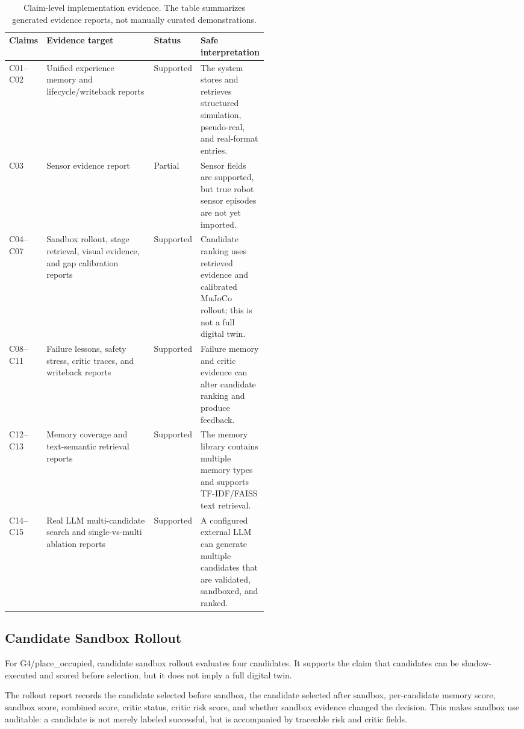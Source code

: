 \documentclass[conference]{IEEEtran}
\begin{document}
\begin{table}[t]
\centering
\caption{Claim-level implementation evidence. The table summarizes generated evidence reports, not manually curated demonstrations.}
\begin{tabularx}{\linewidth}{>{\raggedright\arraybackslash}p{0.14\linewidth}>{\raggedright\arraybackslash}X>{\raggedright\arraybackslash}p{0.18\linewidth}>{\raggedright\arraybackslash}p{0.18\linewidth}}
\toprule
Claims & Evidence target & Status & Safe interpretation \\
\midrule
C01--C02 & Unified experience memory and lifecycle/writeback reports & Supported & The system stores and retrieves structured simulation, pseudo-real, and real-format entries. \\
C03 & Sensor evidence report & Partial & Sensor fields are supported, but true robot sensor episodes are not yet imported. \\
C04--C07 & Sandbox rollout, stage retrieval, visual evidence, and gap calibration reports & Supported & Candidate ranking uses retrieved evidence and calibrated MuJoCo rollout; this is not a full digital twin. \\
C08--C11 & Failure lessons, safety stress, critic traces, and writeback reports & Supported & Failure memory and critic evidence can alter candidate ranking and produce feedback. \\
C12--C13 & Memory coverage and text-semantic retrieval reports & Supported & The memory library contains multiple memory types and supports TF-IDF/FAISS text retrieval. \\
C14--C15 & Real LLM multi-candidate search and single-vs-multi ablation reports & Supported & A configured external LLM can generate multiple candidates that are validated, sandboxed, and ranked. \\
\bottomrule
\end{tabularx}
\label{tab:claim_evidence}
\end{table}

\subsection{Candidate Sandbox Rollout}
For G4/place\_occupied, candidate sandbox rollout evaluates four candidates. It supports the claim that candidates can be shadow-executed and scored before selection, but it does not imply a full digital twin.

The rollout report records the candidate selected before sandbox, the candidate selected after sandbox, per-candidate memory score, sandbox score, combined score, critic status, critic risk score, and whether sandbox evidence changed the decision. This makes sandbox use auditable: a candidate is not merely labeled successful, but is accompanied by traceable risk and critic fields.
\end{document}
